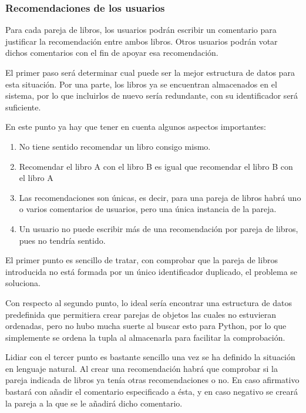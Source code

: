 \subsubsection{Recomendaciones de los usuarios}

Para cada pareja de libros, los usuarios podrán escribir un comentario para justificar la recomendación entre ambos libros. Otros usuarios podrán votar dichos comentarios con el fin de apoyar esa recomendación.

El primer paso será determinar cual puede ser la mejor estructura de datos para esta situación. Por una parte, los libros ya se encuentran almacenados en el sistema, por lo que incluirlos de nuevo sería redundante, con su identificador será suficiente.

En este punto ya hay que tener en cuenta algunos aspectos importantes:

\begin{enumerate}
    \item No tiene sentido recomendar un libro consigo mismo.
    \item Recomendar el libro A con el libro B es igual que recomendar el libro B con el libro A
    \item Las recomendaciones son únicas, es decir, para una pareja de libros habrá uno o varios comentarios de usuarios, pero una única instancia de la pareja.
    \item Un usuario no puede escribir más de una recomendación por pareja de libros, pues no tendría sentido.
\end{enumerate}

El primer punto es sencillo de tratar, con comprobar que la pareja de libros introducida no está formada por un único identificador duplicado, el problema se soluciona.

Con respecto al segundo punto, lo ideal sería encontrar una estructura de datos predefinida que permitiera crear parejas de objetos las cuales no estuvieran ordenadas, pero no hubo mucha suerte al buscar esto para Python, por lo que simplemente se ordena la tupla al almacenarla para facilitar la comprobación.

Lidiar con el tercer punto es bastante sencillo una vez se ha definido la situación en lenguaje natural. Al crear una recomendación habrá que comprobar si la pareja indicada de libros ya tenía otras recomendaciones o no. En caso afirmativo bastará con añadir el comentario especificado a ésta, y en caso negativo se creará la pareja a la que se le añadirá dicho comentario.

